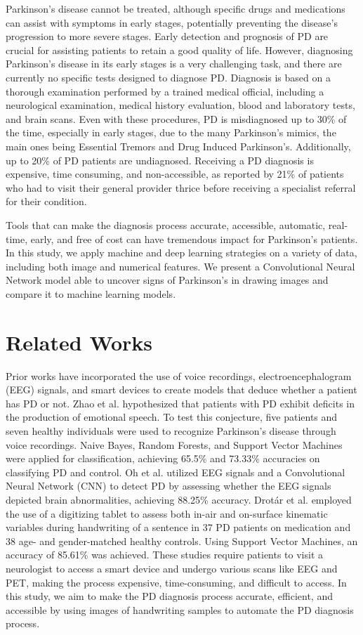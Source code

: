 \documentclass[pmlr,twocolumn,10pt]{jmlr} %
\begin{document}
Parkinson’s disease cannot be treated, although specific drugs and medications can assist with symptoms in early stages, potentially preventing the disease’s progression to more severe stages. Early detection and prognosis of PD are crucial for assisting patients to retain a good quality of life. However, diagnosing Parkinson’s disease in its early stages is a very challenging task, and there are currently no specific tests designed to diagnose PD. Diagnosis is based on a thorough examination performed by a trained medical official, including a neurological examination, medical history evaluation, blood and laboratory tests, and brain scans. Even with these procedures, PD is misdiagnosed up to 30\% of the time, especially in early stages, due to the many Parkinson’s mimics, the main ones being Essential Tremors and Drug Induced Parkinson’s. Additionally, up to 20\% of PD patients are undiagnosed. Receiving a PD diagnosis is expensive, time consuming, and non-accessible, as reported by 21\% of patients who had to visit their general provider thrice before receiving a specialist referral for their condition. 

Tools that can make the diagnosis process accurate, accessible, automatic, real-time, early, and free of cost can have tremendous impact for Parkinson’s patients. In this study, we apply machine and deep learning strategies on a variety of data, including both image and numerical features. We present a Convolutional Neural Network model able to uncover signs of Parkinson’s in drawing images and compare it to machine learning models.

\section{Related Works}
\label{related-works}
Prior works have incorporated the use of voice recordings, electroencephalogram (EEG) signals, and smart devices to create models that deduce whether a patient has PD or not. Zhao et al. hypothesized that patients with PD exhibit deficits in the production of emotional speech. To test this conjecture, five patients and seven healthy individuals were used to recognize Parkinson’s disease through voice recordings. Naive Bayes, Random Forests, and Support Vector Machines were applied for classification, achieving 65.5\% and 73.33\% accuracies on classifying PD and control. Oh et al. utilized EEG signals and a Convolutional Neural Network (CNN) to detect PD
by assessing whether the EEG signals depicted brain abnormalities, achieving 88.25\% accuracy. Drotár et al. employed the use of a digitizing tablet to assess both in-air and on-surface kinematic variables during handwriting of a sentence in 37 PD patients on medication and 38 age- and gender-matched healthy controls. Using Support Vector Machines, an accuracy of 85.61\% was achieved. These studies require patients to visit a neurologist to access a smart device and undergo various scans like EEG and PET, making the process expensive, time-consuming, and difficult to access. In this study, we aim to make the PD diagnosis process accurate, efficient, and accessible by using images of handwriting samples to automate the PD diagnosis process. 
\end{document}
